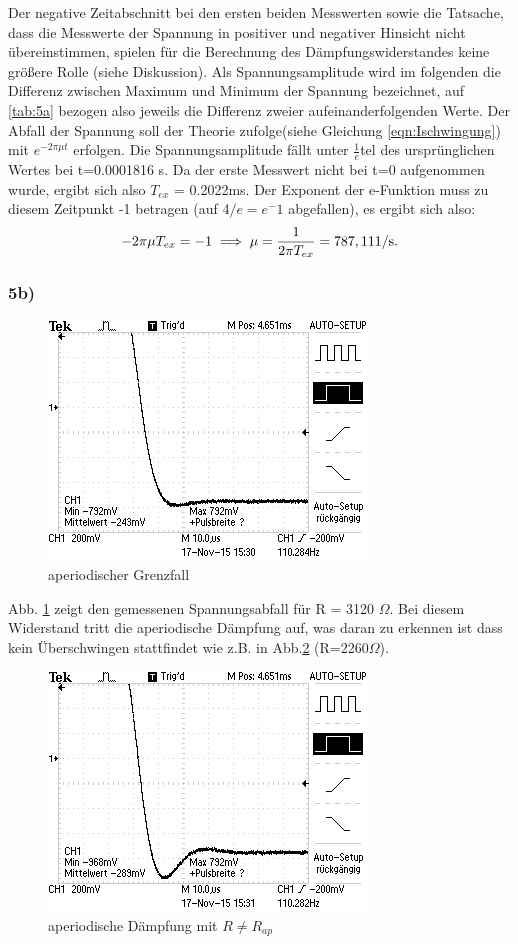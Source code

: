 Der negative Zeitabschnitt bei den ersten beiden Messwerten
sowie die Tatsache, dass
die Messwerte der Spannung
in positiver und negativer Hinsicht nicht übereinstimmen,
spielen für die Berechnung des Dämpfungswiderstandes keine größere Rolle
(siehe Diskussion).
Als Spannungsamplitude wird im folgenden die Differenz zwischen Maximum und
Minimum der Spannung bezeichnet, auf \ref{tab:5a} bezogen also jeweils die
Differenz zweier aufeinanderfolgenden Werte.
Der Abfall der Spannung soll der Theorie
zufolge(siehe Gleichung \ref{eqn:Ischwingung})
mit $e^{-2\pi\mu t}$ erfolgen. Die Spannungsamplitude fällt unter
$\frac{1}{e}$tel des ursprünglichen Wertes bei t=0.0001816 s.
Da der erste Messwert
nicht bei t=0 aufgenommen wurde, ergibt sich also $T_{ex}$ = 0.2022ms.
Der Exponent der e-Funktion muss zu diesem Zeitpunkt -1 betragen (auf 4$/e=e^-1$
abgefallen), es ergibt sich also:
\begin{equation}
  -2\pi\mu T_{ex} = -1 \\
  \implies \mu = \frac{1}{2\pi T_{ex}} = 787,11 \text{1/s.}
\end{equation}

\subsubsection{5b)}
\begin{figure}
  \centering
  \includegraphics{data/F0001TEK.jpg}
  \caption{aperiodischer Grenzfall}
  \label{fig:5bergebnis}
\end{figure}

Abb. \ref{fig:5bergebnis} zeigt den gemessenen Spannungsabfall für
R = 3120 $\Omega$.
Bei diesem Widerstand tritt die aperiodische Dämpfung auf, was daran zu erkennen
ist dass kein Überschwingen stattfindet wie z.B. in Abb.\ref{fig:über}
(R=2260$\Omega$).
\begin{figure}
  \centering
  \includegraphics{data/F0002TEK.jpg}
  \caption{aperiodische Dämpfung mit $R \neq R_{ap}$}
  \label{fig:über}
\end{figure}

